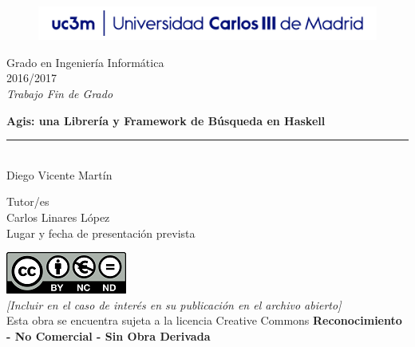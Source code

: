 \documentclass[a4paper,12pt]{article}
\begin{document}
\begin{titlepage}
  \begin{sffamily}
  \color{azulUC3M}
  \begin{center}
    \begin{figure}[htb]
      \begin{center}
        \vspace*{0.6cm}
        \includegraphics[width=15cm]{img/Portada_Logo.png}
        \vspace*{1.6cm}
      \end{center}
    \end{figure}
    
    \begin{LARGE}
      Grado en Ingeniería Informática \\
      2016/2017 \\
      \vspace*{2cm}
      \textsl{Trabajo Fin de Grado}\\
    \end{LARGE}
    
    \begin{huge}
      \textbf{Agis: una Librería y Framework de Búsqueda en Haskell} \\
      \rule{80mm}{0.1mm}\\
      \vspace*{1cm}
      Diego Vicente Martín\\
    \end{huge}
    
    \vspace*{1cm}
    \begin{Large}
      Tutor/es\\
      Carlos Linares López\\
      Lugar y fecha de presentación prevista\\
    \end{Large}
  \end{center}
  \vspace*{3cm}
  \color{black}
  \includegraphics{img/creativecommons.png}\\
  \emph{[Incluir en el caso de interés en su publicación en el archivo abierto]}\\
  Esta obra se encuentra sujeta a la licencia Creative Commons
  \textbf{Reconocimiento - No Comercial - Sin Obra Derivada}
  
\end{sffamily}
\end{titlepage}
\end{document}
